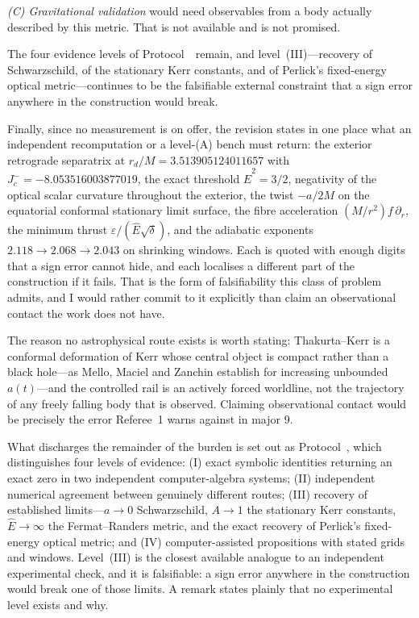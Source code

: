 \documentclass[11pt]{article}
\begin{document}
\emph{(C) Gravitational validation} would need observables from a body actually
described by this metric. That is not available and is not promised.

The four evidence levels of Protocol~\msProtEvidence\ remain, and level~(III)---recovery
of Schwarzschild, of the stationary Kerr constants, and of Perlick's fixed-energy
optical metric---continues to be the falsifiable external constraint that a sign
error anywhere in the construction would break.

Finally, since no measurement is on offer, the revision states in one place what an
independent recomputation or a level-(A) bench must return: the exterior retrograde
separatrix at $r_d/M=3.513905124011657$ with $J_c^-=-8.053516003877019$, the exact
threshold $\hat E^2=3/2$, negativity of the optical scalar curvature throughout the
exterior, the twist $-a/2M$ on the equatorial conformal stationary limit surface, the
fibre acceleration $(M/r^2)f\,\partial_r$, the minimum thrust
$\varepsilon/(\hat E\sqrt\delta)$, and the adiabatic exponents
$2.118\to2.068\to2.043$ on shrinking windows. Each is quoted with enough digits that
a sign error cannot hide, and each localises a different part of the construction if
it fails. That is the form of falsifiability this class of problem admits, and I
would rather commit to it explicitly than claim an observational contact the work
does not have.

The reason no astrophysical route exists is worth stating: Thakurta--Kerr is a
conformal deformation of Kerr whose central object is compact rather than a black
hole---as Mello, Maciel and Zanchin establish for increasing unbounded $a(t)$---and
the controlled rail is an actively forced worldline, not the trajectory of any
freely falling body that is observed. Claiming observational contact would be
precisely the error Referee~1 warns against in major 9.

What discharges the remainder of the burden is set out as
Protocol~\msProtEvidence, which distinguishes four levels of evidence: (I) exact symbolic
identities returning an exact zero in two independent computer-algebra systems;
(II) independent numerical agreement between genuinely different routes;
(III) recovery of established limits---$a\to0$ Schwarzschild, $A\to1$ the
stationary Kerr constants, $\hat E\to\infty$ the Fermat--Randers metric, and the
exact recovery of Perlick's fixed-energy optical metric; and (IV) computer-assisted
propositions with stated grids and windows. Level~(III) is the closest available
analogue to an independent experimental check, and it is falsifiable: a sign
error anywhere in the construction would break one of those limits. A remark
states plainly that no experimental level exists and why.
\end{document}
